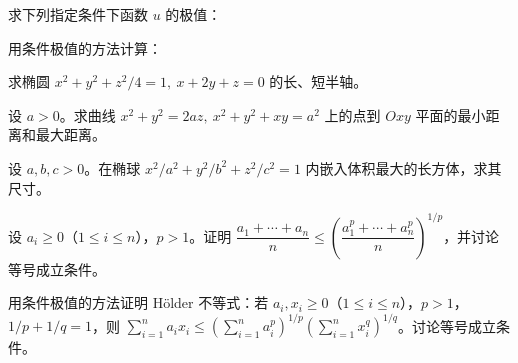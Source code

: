 \noindent\begin{minipage}{\textwidth}
求下列指定条件下函数 $u$ 的极值：
\end{minipage}\par\vfill
\noindent\begin{minipage}{\textwidth}
用条件极值的方法计算：
\end{minipage}\par\vfill
\newpage
\noindent\begin{minipage}{\textwidth}
求椭圆 $x^2+y^2+z^2/4=1,\ x+2y+z=0$ 的长、短半轴。
\end{minipage}\par\vfill
\noindent\begin{minipage}{\textwidth}
设 $a>0$。求曲线 $x^2+y^2=2az,\ x^2+y^2+xy=a^2$ 上的点到 $Oxy$ 平面的最小距离和最大距离。
\end{minipage}\par\vfill
\noindent\begin{minipage}{\textwidth}
设 $a,b,c>0$。在椭球 $x^2/a^2+y^2/b^2+z^2/c^2=1$ 内嵌入体积最大的长方体，求其尺寸。
\end{minipage}\par\vfill
\newpage
\noindent\begin{minipage}{\textwidth}
设 $a_i\ge0$（$1\le i\le n$），$p>1$。证明 $\dfrac{a_1+\cdots+a_n}{n}\le\left(\dfrac{a_1^p+\cdots+a_n^p}{n}\right)^{1/p}$，并讨论等号成立条件。
\end{minipage}\par\vfill
\noindent\begin{minipage}{\textwidth}
用条件极值的方法证明 Hölder 不等式：若 $a_i,x_i\ge0$（$1\le i\le n$），$p>1$，$1/p+1/q=1$，则 $\sum_{i=1}^n a_ix_i\le\left(\sum_{i=1}^n a_i^p\right)^{1/p}\left(\sum_{i=1}^n x_i^q\right)^{1/q}$。讨论等号成立条件。
\end{minipage}\par\vfill
